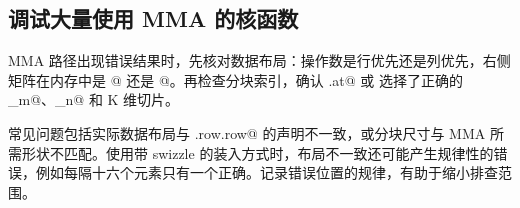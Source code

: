 \subsection*{调试大量使用 MMA 的核函数}

MMA 路径出现错误结果时，先核对数据布局：操作数是行优先还是列优先，右侧矩阵在内存中是 \co@[N, K]@ 还是 \co@[K, N]@。再检查分块索引，确认 \co@.at@ 或 \co@chunkat@ 选择了正确的 \co@block_m@、\co@block_n@ 和 K 维切片。

常见问题包括实际数据布局与 \co@mma.row.row@ 的声明不一致，或分块尺寸与 MMA 所需形状不匹配。使用带 swizzle 的装入方式时，布局不一致还可能产生规律性的错误，例如每隔十六个元素只有一个正确。记录错误位置的规律，有助于缩小排查范围。
